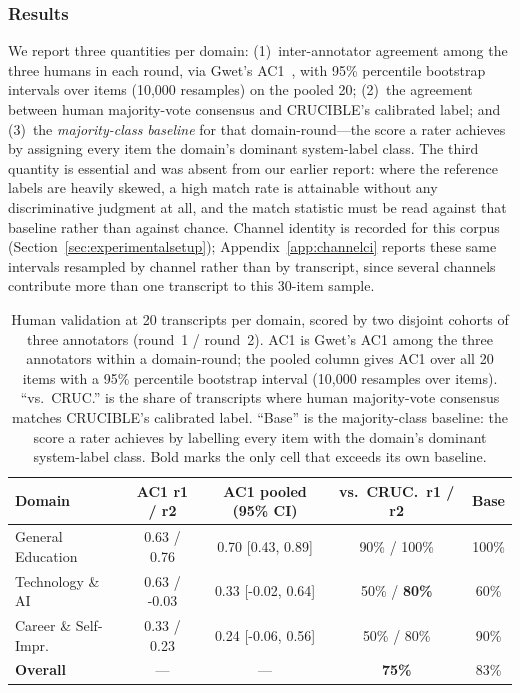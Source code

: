 \documentclass[11pt]{article}
\begin{document}
\subsubsection{Results}

We report three quantities per domain: (1)~inter-annotator agreement among
the three humans in each round, via Gwet's AC1~\cite{gwet2008}, with 95\%
percentile bootstrap intervals over items (10{,}000 resamples) on the
pooled 20; (2)~the agreement between human majority-vote consensus and
CRUCIBLE's calibrated label; and (3)~the \emph{majority-class baseline} for
that domain-round---the score a rater achieves by assigning every item the
domain's dominant system-label class. The third quantity is essential and
was absent from our earlier report: where the reference labels are
heavily skewed, a high match rate is attainable without any discriminative
judgment at all, and the match statistic must be read against that
baseline rather than against chance.
Channel identity is recorded for this corpus (Section~\ref{sec:experimentalsetup});
Appendix~\ref{app:channelci} reports these same intervals resampled by
channel rather than by transcript, since several channels contribute more
than one transcript to this 30-item sample.

\begin{table}[ht]
\centering
\caption{Human validation at 20 transcripts per domain, scored by two
disjoint cohorts of three annotators (round~1 / round~2). AC1 is Gwet's
AC1 among the three annotators within a domain-round; the pooled column
gives AC1 over all 20 items with a 95\% percentile bootstrap interval
(10{,}000 resamples over items). ``vs.\ CRUC.'' is the share of
transcripts where human majority-vote consensus matches CRUCIBLE's
calibrated label. ``Base'' is the majority-class baseline: the score a
rater achieves by labelling every item with the domain's dominant
system-label class. Bold marks the only cell that exceeds its own
baseline.}
\label{tab:humanval}
\small
\begin{tabular}{lcccc}
\toprule
\textbf{Domain} & \textbf{AC1 r1 / r2} & \textbf{AC1 pooled (95\% CI)} &
\textbf{vs.\ CRUC.\ r1 / r2} & \textbf{Base} \\
\midrule
General Education      & 0.63 / 0.76 & 0.70 [0.43, 0.89] & 90\% / 100\% & 100\% \\
Technology \& AI       & 0.63 / -0.03 & 0.33 [-0.02, 0.64] & 50\% / \textbf{80\%} & 60\% \\
Career \& Self-Impr.   & 0.33 / 0.23 & 0.24 [-0.06, 0.56] & 50\% / 80\% & 90\% \\
\midrule
\textbf{Overall}        & --- & --- & \textbf{75\%} & 83\% \\
\bottomrule
\end{tabular}
\end{table}
\end{document}
